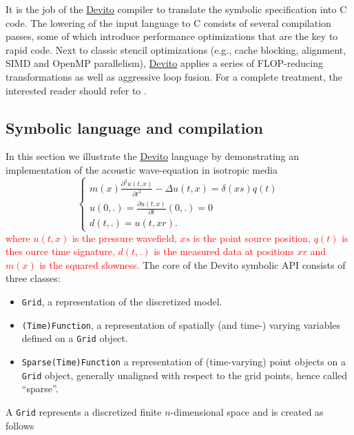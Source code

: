\documentclass[10pt, conference]{IEEEtran}
\newcommand{\devito}{\href{https://github.com/devitocodes/devito}{Devito} }
\begin{document}
It is the job of the \devito compiler to translate the symbolic specification
into C code. The lowering of the input language to C consists of
several compilation passes, some of which introduce performance
optimizations that are the key to rapid code. Next to classic stencil
optimizations (e.g., cache blocking, alignment, SIMD and OpenMP
parallelism), \devito applies a series of FLOP-reducing transformations as
well as aggressive loop fusion. For a complete treatment, the interested
reader should refer to \cite{devito-compiler}.

\subsection{Symbolic language and
compilation}\label{symbolic-language-and-compilation}

In this section we illustrate the \devito language by demonstrating
an implementation of the acoustic wave-equation in isotropic media
%
\begin{equation}
\begin{cases}
 m(x) \frac{\partial^2 u(t, x)}{\partial t^2} - \Delta u(t, x) = \delta(xs) q(t) \\
 u(0, .) = \frac{\partial u(t, x)}{\partial t}(0, .) = 0 \\
 d(t, .) = u(t, xr).
 \end{cases}
\label{acou}
\end{equation}
%
\textcolor{red}{where $u(t, x)$ is the pressure wavefield, $xs$ is the point source position, 
$q(t)$ is thes ource time signature, $d(t, .)$ is the measured data at positions $xr$ and $m(x)$ is the 
squared slowness.}
 The core of the Devito
symbolic API consists of three classes:

\begin{itemize}
\itemsep1pt\parskip0pt
\item
  \texttt{Grid}, a representation of the discretized model.
\item
  \texttt{(Time)Function}, a representation of spatially (and time-)
  varying variables defined on a \texttt{Grid} object.
\item
  \texttt{Sparse(Time)Function} a representation of (time-varying) point
  objects on a \texttt{Grid} object, generally unaligned with respect to
  the grid points, hence called ``sparse''.
\end{itemize}

A \texttt{Grid} represents a discretized finite $n$-dimensional space and
is created as follows
\end{document}
